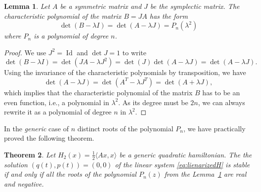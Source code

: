 \documentclass[english,fontsize=11pt,paper=b5]{scrbook}
\numberwithin{equation}{chapter}
\DeclareMathOperator{\Id}{Id}
\DeclareMathOperator{\Id}{Id}
\newtheorem{theorem}{Theorem}[chapter]
\newtheorem{lemma}[theorem]{Lemma}
\theoremstyle{definition}
\begin{document}
      \begin{lemma}\label{eq:lemmaCP}
        Let $A$ be a symmetric matrix and $J$ be the symplectic matrix.
        The characteristic polynomial of the matrix $B=JA$ has the form
        \begin{equation}
          \det(B-\lambda I) = \det(A-\lambda J) = P_n(\lambda^2)
        \end{equation}
        where $P_n$ is a polynomial of degree $n$.
      \end{lemma}
      \begin{proof}
        We use $J^2 = \Id$ and $\det J= 1$ to write
        \begin{equation}
          \det(B-\lambda I) = \det(JA - \lambda J^2) = \det(J) \det(A-\lambda J) = \det(A-\lambda J).
        \end{equation}
        Using the invariance of the characteristic polynomials by transposition, we have
        \begin{equation}
          \det(A-\lambda J) = \det(A^T -\lambda J^T) = \det(A + \lambda J),
        \end{equation}
        which implies that the characteristic polynomial of the matrix $B$ has to be an even function, i.e., a polynomial in $\lambda^2$.
        As its degree must be $2n$, we can always rewrite it as a polynomial of degree $n$ in $\lambda^2$.
      \end{proof}

      In the \emph{generic} case of $n$ distinct roots of the polynomial $P_n$, we have practically proved the following theorem.

      \begin{theorem}
        Let $H_2(x) = \frac12\langle Ax,x\rangle$ be a generic quadratic hamiltonian. The the solution $(q(t), p(t)) = (0,0)$ of the linear system \eqref{eq:lienarizedH} is stable if and only if all the roots of the polynomial $P_n(z)$ from the Lemma~\ref{eq:lemmaCP} are real and negative.
      \end{theorem}
\end{document}
